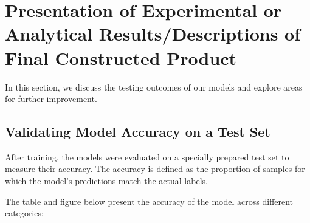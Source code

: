 \section{Presentation of Experimental or Analytical Results/Descriptions of Final Constructed Product}

In this section, we discuss the testing outcomes of our models and explore areas for further improvement.

\subsection{Validating Model Accuracy on a Test Set}

After training, the models were evaluated on a specially prepared test set to measure their accuracy. The accuracy is defined as the proportion of samples for which the model's predictions match the actual labels.

The table and figure below present the accuracy of the model across different categories:

